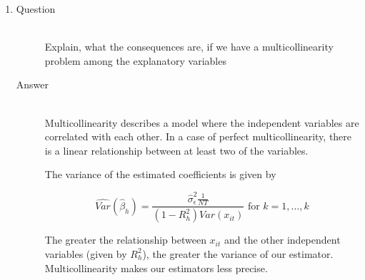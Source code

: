 \documentclass{article}
\begin{document}
  \begin{enumerate}[label=(\alph*)]
    \item 
    \begin{description}
      \item[Question] \hfill \\
      Explain, what the consequences are, if we have a multicollinearity problem among the explanatory variables
      \item[Answer] \hfill \\
      Multicollinearity describes a model where the independent variables are correlated with each other. In a case of perfect multicollinearity, there is a linear relationship between at least two of the variables.
      
      The variance of the estimated coefficients is given by
      
      \begin{displaymath} 
      \hat{Var}(\hat{\beta}_h) = \frac{\hat{\sigma}^2_{\epsilon}\frac{1}{NT}}{(1-R^2_h)Var(x_{it})} \text{ for } k=1,\ldots,k
      \end{displaymath}
      
      The greater the relationship between \(x_{it}\) and the other independent variables (given by \(R^2_h\)), the greater the variance of our estimator. Multicollinearity makes our estimators less precise.
    \end{description}
  \end{enumerate}
  
\end{document}
